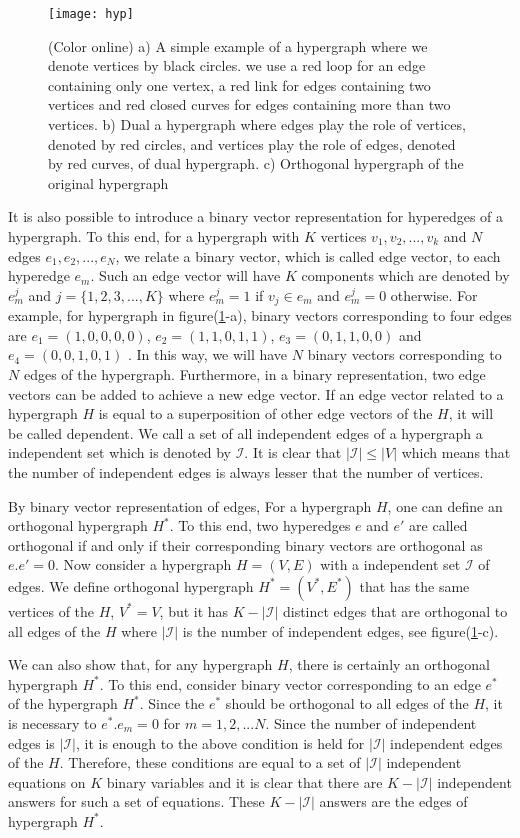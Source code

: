 \documentclass[preprintnumbers, showpacs, floatfix,twocolumn,
preprintnumbers, superscriptaddress]{revtex4}
\begin{document}
\begin{figure}[t]
\centering
\texttt{[image: hyp]}
\caption{(Color online) a) A simple example of a hypergraph where we denote vertices by black circles. we use a red loop for an edge containing only one vertex, a red link for edges containing two vertices and red closed curves for edges containing more than two vertices. b) Dual a hypergraph where edges play the role of vertices, denoted by red circles, and vertices play the role of edges, denoted by red curves, of dual hypergraph. c) Orthogonal hypergraph of the original hypergraph} \label{hyp}
\end{figure}
It is also possible to introduce a binary vector representation
for hyperedges of a hypergraph. To this end, for a hypergraph with
$K$ vertices $v_1 , v_2 ,..., v_k$ and $N$ edges $e_1 , e_2 , ...,
e_N$, we  relate a binary vector, which is called edge vector, to
each hyperedge $e_m$. Such an edge vector will have $K$ components
which are denoted by $e_{m}^{j}$ and $j=\{1,2,3,...,K\}$ where
$e_{m}^{j}=1$ if $v_{j} \in e_m$ and $e_{m}^{j}=0$ otherwise. For
example, for hypergraph in figure(\ref{hyp}-a), binary vectors
corresponding to four edges are $e_1 =(1,0,0,0,0)$, $e_2
=(1,1,0,1,1)$, $e_3 =(0,1,1,0,0)$ and $e_4 =(0,0,1,0,1)$ . In this
way, we will have $N$ binary vectors corresponding to $N$ edges of
the hypergraph. Furthermore, in a binary representation, two edge
vectors can be added to achieve a new edge vector. If an edge
vector related to a hypergraph $H$ is equal to a superposition of
other edge vectors of the $H$, it will be called dependent. We
call a set of all independent edges of a hypergraph a independent
set which is denoted by $\mathcal{I}$. It is clear that
$|\mathcal{I}|\leq |V|$ which means that the number of independent
edges is always lesser that the number of vertices.

By binary vector representation of edges, For a hypergraph $H$,
one can define an orthogonal hypergraph $H^{*}$. To this end, two
hyperedges $e$ and $e'$ are called orthogonal if and only if their
corresponding binary vectors are orthogonal as $e.e'=0$. Now
consider a hypergraph $H=(V,E)$ with a independent set
$\mathcal{I}$ of edges.  We define orthogonal hypergraph
$H^{*}=(V^{*},E^{*})$ that has the same vertices of the $H$,
$V^{*}=V$, but it has $K-|\mathcal{I}|$ distinct edges that are
orthogonal to all edges of the $H$ where $|\mathcal{I}|$ is the
number of independent edges, see figure(\ref{hyp}-c).

 We can also show that, for any hypergraph $H$, there is certainly an orthogonal hypergraph $H^{*}$. To this end, consider binary vector corresponding to an edge $e^{*}$ of the hypergraph $H^{*}$. Since the $e^{*}$ should be orthogonal to all edges of the $H$, it is necessary to $e^{*}.e_{m}=0$ for $m=1,2,...N$. Since the number of independent edges is $|\mathcal{I}|$, it is enough to the above condition is held for $|\mathcal{I}|$ independent edges of the $H$. Therefore, these conditions are equal to a set of $|\mathcal{I}|$ independent equations on $K$ binary variables and it is clear that there are $K-|\mathcal{I}|$ independent answers for such a set of equations. These $K-|\mathcal{I}|$ answers are the edges of hypergraph $H^{*}$.
\end{document}
